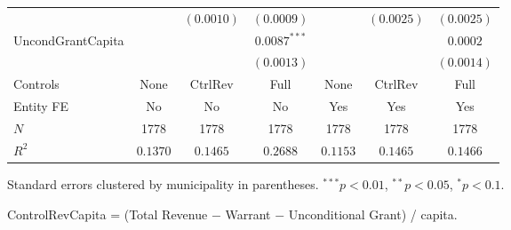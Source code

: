 \begin{table}[H]
\begin{minipage}{\textwidth}
\begin{tabular}{lcccccc}
         &  & $(0.0010)$ & $(0.0009)$ &  & $(0.0025)$ & $(0.0025)$ \\[4pt]
        UncondGrantCapita &  &  & $0.0087^{***}$ &  &  & $0.0002$ \\
         &  &  & $(0.0013)$ &  &  & $(0.0014)$ \\[4pt]
        \midrule
        Controls & None & CtrlRev & Full & None & CtrlRev & Full \\
        Entity FE & No & No & No & Yes & Yes & Yes \\
        $N$ & 1778 & 1778 & 1778 & 1778 & 1778 & 1778 \\
        $R^2$ & $0.1370$ & $0.1465$ & $0.2688$ & $0.1153$ & $0.1465$ & $0.1466$ \\
        \bottomrule
    \end{tabular}

    \vspace{6pt}
    {\scriptsize Standard errors clustered by municipality in parentheses. $^{***}p<0.01$, $^{**}p<0.05$, $^{*}p<0.1$.}

    {\scriptsize ControlRevCapita = (Total Revenue $-$ Warrant $-$ Unconditional Grant) / capita.}
    \end{minipage}
\end{table}